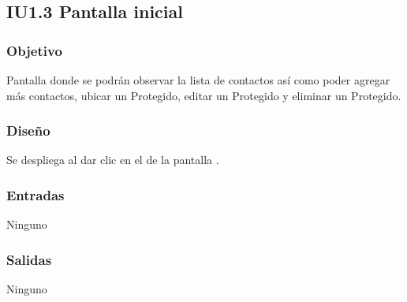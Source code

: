 \newpage
\subsection{IU1.3 Pantalla inicial}

\subsubsection{Objetivo}
	Pantalla donde se podrán observar la lista de contactos así como poder agregar más contactos, ubicar un Protegido, editar un Protegido y eliminar un Protegido.

\subsubsection{Diseño}
	Se despliega al dar clic en el  de la pantalla .


\subsubsection{Entradas}
	Ninguno
\subsubsection{Salidas}
	Ninguno